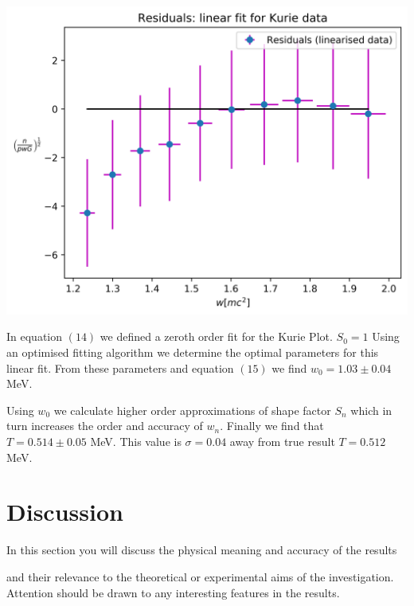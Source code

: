 \documentclass[10pt, a4paper]{article}
\newenvironment{Figure}
    {\par\medskip\noindent\minipage{\linewidth}}
    {\endminipage\par\medskip}
\begin{document}
\begin{multicols}{2}
\begin{Figure}
 \centering
 \includegraphics[width=\linewidth]{linear_residuals_Kurie_linear_data.png}
\end{Figure}

In equation $(14)$ we defined a zeroth order fit for the Kurie Plot. $S_0 = 1$ 
Using an optimised fitting algorithm we determine the optimal parameters for this linear fit.
From these parameters and equation $(15)$ we find $w_0 = 1.03 \pm 0.04$ MeV.

Using $w_0$ we calculate higher order approximations of shape factor $S_n$ which in turn increases the order and accuracy of $w_n$.
Finally we find that $T = 0.514 \pm 0.05$ MeV. This value is $\sigma = 0.04$ away from true result $T = 0.512$ MeV.

\section{Discussion}


In this section you will discuss the physical meaning and accuracy of the results

 and their relevance to the theoretical or experimental aims of the investigation. Attention should be drawn to any interesting features in the results.


\end{multicols}
\end{document}
